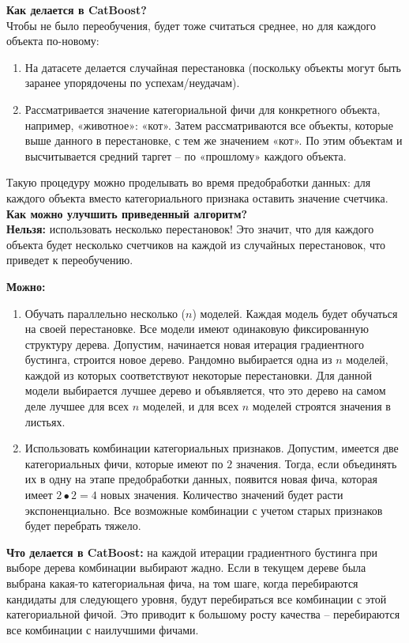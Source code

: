 \documentclass[a4paper,12pt]{article}
\begin{document}
\textbf{Как делается в CatBoost?}  \\

Чтобы не было переобучения, будет тоже считаться среднее, но для каждого объекта по-новому: 
\begin{enumerate}[noitemsep]
\item На датасете делается случайная перестановка (поскольку объекты могут быть заранее упорядочены по успехам/неудачам). 
\item Рассматривается значение категориальной фичи для конкретного объекта, например, «животное»: «кот». Затем рассматриваются все объекты, которые выше данного в перестановке, с тем же значением «кот». По этим объектам и высчитывается средний таргет – по «прошлому» каждого объекта. 
\end{enumerate}

Такую процедуру можно проделывать во время предобработки данных: для каждого объекта вместо категориального признака оставить значение счетчика. \\

\textbf{Как можно улучшить приведенный алгоритм?} \\

\textbf{Нельзя:} использовать несколько перестановок! Это значит, что для каждого объекта будет несколько счетчиков на каждой из случайных перестановок, что приведет к переобучению.

\textbf{Можно:}
 \begin{enumerate}[noitemsep]
\item Обучать параллельно несколько ($n$) моделей. Каждая модель будет обучаться на своей перестановке. Все модели имеют одинаковую фиксированную структуру дерева. 
Допустим, начинается новая итерация градиентного бустинга, строится новое дерево. Рандомно выбирается одна из $n$ моделей, каждой из которых соответствуют некоторые перестановки. Для данной модели выбирается лучшее дерево и объявляется, что это дерево на самом деле лучшее для всех $n$ моделей, и для всех $n$ моделей строятся значения в листьях. 
\item Использовать комбинации категориальных признаков. Допустим, имеется две категориальных фичи, которые имеют по $2$ значения. Тогда, если объединять их в одну на этапе предобработки данных, появится новая фича, которая имеет $2∙2=4$ новых значения. Количество значений будет расти экспоненциально. Все возможные комбинации с учетом старых признаков будет перебрать тяжело. 
\end{enumerate}
\textbf{Что делается в CatBoost:} на каждой итерации градиентного бустинга при выборе дерева комбинации выбирают жадно. Если в текущем дереве была выбрана какая-то категориальная фича, на том шаге, когда перебираются кандидаты для следующего уровня, будут перебираться все комбинации с этой категориальной фичой. Это приводит к большому росту качества – перебираются все комбинации с наилучшими фичами. 
\end{document}
